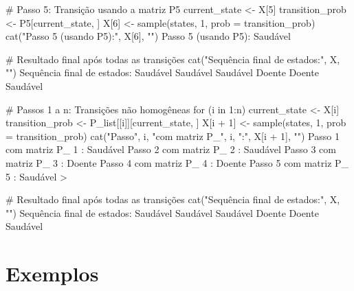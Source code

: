 \documentclass[12pt]{article}
\theoremstyle{break}
\begin{document}
\begin{itemize}
\begin{RCodeBox}
# Passo 5: Transição usando a matriz P5
current_state <- X[5]
transition_prob <- P5[current_state, ]
X[6] <- sample(states, 1, prob = transition_prob)
cat("Passo 5 (usando P5):", X[6], "\n")
Passo 5 (usando P5): Saudável

# Resultado final após todas as transições
cat("Sequência final de estados:", X, "\n")
Sequência final de estados: Saudável Saudável Saudável Doente Doente Saudável 
\end{RCodeBox}






\begin{RCodeBox}
# Passos 1 a n: Transições não homogêneas
for (i in 1:n) {
  current_state <- X[i]
  transition_prob <- P_list[[i]][current_state, ]
  X[i + 1] <- sample(states, 1, prob = transition_prob)
  cat("Passo", i, "com matriz P_", i, ":", X[i + 1], "\n")
}
Passo 1 com matriz P_ 1 : Saudável 
Passo 2 com matriz P_ 2 : Saudável 
Passo 3 com matriz P_ 3 : Doente 
Passo 4 com matriz P_ 4 : Doente 
Passo 5 com matriz P_ 5 : Saudável 
> 

# Resultado final após todas as transições
cat("Sequência final de estados:", X, "\n")
Sequência final de estados: Saudável Saudável Saudável Doente Doente Saudável 
\end{RCodeBox}





\end{itemize}








\section{Exemplos}
\end{document}
